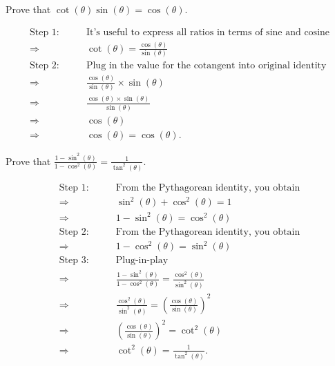 \begin{exc}
	Prove that $\cot(\theta)\sin(\theta) = \cos(\theta)$.

	\solution

	\begin{align*}
		\textrm{Step 1:}\qquad & \textrm{It's useful to express all ratios in terms of sine and cosine} \\
		\Rightarrow\qquad      & \cot(\theta) = \frac{\cos(\theta)}{\sin(\theta)}                       \\
		\textrm{Step 2:}\qquad & \textrm{Plug in the value for the cotangent into original identity}    \\
		\Rightarrow\qquad      & \frac{\cos(\theta)}{\sin(\theta)} \times \sin(\theta)                  \\
		\Rightarrow\qquad      & \frac{\cos(\theta) \times \sin(\theta)}{\sin(\theta)}                  \\
		\Rightarrow\qquad      & \cos(\theta)                                                           \\
		\Rightarrow\qquad      & \cos(\theta) = \cos(\theta)
		.\end{align*}
\end{exc}

\begin{exc}
	Prove that $\displaystyle \frac{1 - \sin^{2}(\theta)}{1 - \cos^{2}(\theta)} =
		\frac{1}{\tan^{2}(\theta)}$.

	\solution

	\begin{align*}
		\textrm{Step 1:}\qquad & \textrm{From the Pythagorean identity, you obtain}                                             \\
		\Rightarrow\qquad      & \sin^{2}(\theta) + \cos^{2}(\theta) = 1                                                        \\
		\Rightarrow\qquad      & 1 - \sin^{2}(\theta) = \cos^{2}(\theta)                                                        \\
		\textrm{Step 2:}\qquad & \textrm{From the Pythagorean identity, you obtain}                                             \\
		\Rightarrow\qquad      & 1 - \cos^{2}(\theta) = \sin^{2}(\theta)                                                        \\
		\textrm{Step 3:}\qquad & \textrm{Plug-in-play}                                                                          \\
		\Rightarrow\qquad      & \frac{1 - \sin^{2}(\theta)}{1 - \cos^{2}(\theta)} = \frac{\cos^{2}(\theta)}{\sin^{2}(\theta)}  \\
		\Rightarrow\qquad      & \frac{\cos^{2}(\theta)}{\sin^{2}(\theta)} = \left(\frac{\cos(\theta)}{\sin(\theta)}\right)^{2} \\
		\Rightarrow\qquad      & \left(\frac{\cos(\theta)}{\sin(\theta)}\right)^{2} = \cot^{2}(\theta)                          \\
		\Rightarrow\qquad      & \cot^{2}(\theta) = \frac{1}{\tan^{2}(\theta)}
		.\end{align*}
\end{exc}

